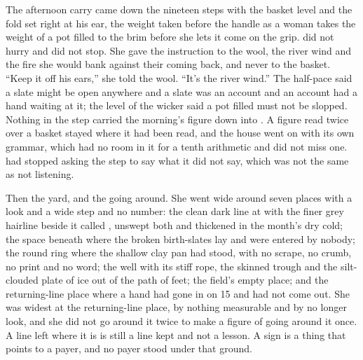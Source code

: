 The afternoon carry came down the nineteen steps with the basket level and the fold set right at his ear, the weight taken before the handle as a woman takes the weight of a pot filled to the brim before she lets it come on the grip.  did not hurry and did not stop. She gave the instruction to the wool, the river wind and the fire she would bank against their coming back, and never to the basket. “Keep it off his ears,” she told the wool. “It's the river wind.” The half-pace said a slate might be open anywhere and a slate was an account and an account had a hand waiting at it; the level of the wicker said a pot filled must not be slopped. Nothing in the step carried the morning's figure down into . A figure read twice over a basket stayed where it had been read, and the house went on with its own grammar, which had no room in it for a tenth arithmetic and did not miss one.  had stopped asking the step to say what it did not say, which was not the same as not listening.

Then the yard, and the going around. She went wide around seven places with a look and a wide step and no number: the clean dark line at  with the finer grey hairline beside it called , unswept both and thickened in the month's dry cold; the space beneath  where the broken birth-slates lay and were entered by nobody; the round ring where the shallow clay pan had stood, with no scrape, no crumb, no print and no word; the well with its stiff rope, the skinned trough and the silt-clouded plate of ice out of the path of feet; the field's empty place; and the returning-line place where a hand had gone in on  15 and had not come out. She was widest at the returning-line place, by nothing measurable and by no longer look, and she did not go around it twice to make a figure of going around it once. A line left where it is is still a line kept and not a lesson. A sign is a thing that points to a payer, and no payer stood under that ground.

